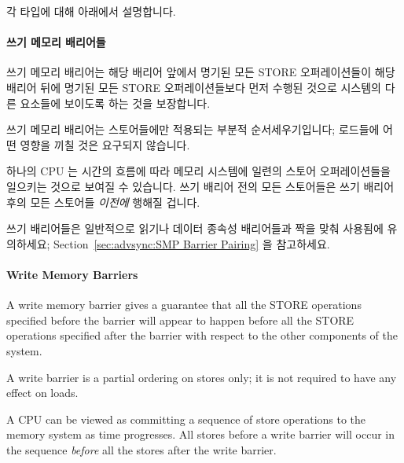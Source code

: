 \begin{enumerate}
각 타입에 대해 아래에서 설명합니다.

\paragraph{쓰기 메모리 배리어들}

쓰기 메모리 배리어는 해당 배리어 앞에서 명기된 모든 STORE 오퍼레이션들이 해당
배리어 뒤에 명기된 모든 STORE 오퍼레이션들보다 먼저 수행된 것으로 시스템의 다른
요소들에 보이도록 하는 것을 보장합니다.

쓰기 메모리 배리어는 스토어들에만 적용되는 부분적 순서세우기입니다; 로드들에
어떤 영향을 끼칠 것은 요구되지 않습니다.

하나의 CPU 는 시간의 흐름에 따라 메모리 시스템에 일련의 스토어 오퍼레이션들을
일으키는 것으로 보여질 수 있습니다.
쓰기 배리어 전의 모든 스토어들은 쓰기 배리어 후의 모든 스토어들 \emph{이전에}
행해질 겁니다.

쓰기 배리어들은 일반적으로 읽기나 데이터 종속성 배리어들과 짝을 맞춰
사용됨에 유의하세요; Section~\ref{sec:advsync:SMP Barrier Pairing} 을
참고하세요.
\iffalse

\paragraph{Write Memory Barriers}

A write memory barrier gives a guarantee that all the STORE operations
specified before the barrier will appear to happen before all the STORE
operations specified after the barrier with respect to the other
components of the system.

A write barrier is a partial ordering on stores only; it is not required
to have any effect on loads.

A CPU can be viewed as committing a sequence of store operations to the
memory system as time progresses.  All stores before a write barrier will
occur in the sequence \emph{before} all the stores after the write barrier.


\end{enumerate}
